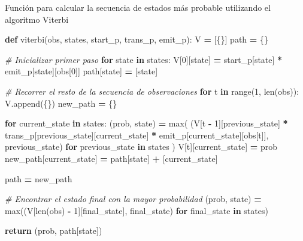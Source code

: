 \documentclass[
  a4paper,
  DIV=11,
  numbers=noendperiod]{scrreprt}
\newenvironment{Shaded}{\begin{snugshade}}{\end{snugshade}}
\newcommand{\BuiltInTok}[1]{#1}
\newcommand{\CommentTok}[1]{\textcolor[rgb]{0.56,0.35,0.01}{\textit{#1}}}
\newcommand{\ControlFlowTok}[1]{\textcolor[rgb]{0.13,0.29,0.53}{\textbf{#1}}}
\newcommand{\DecValTok}[1]{\textcolor[rgb]{0.00,0.00,0.81}{#1}}
\newcommand{\KeywordTok}[1]{\textcolor[rgb]{0.13,0.29,0.53}{\textbf{#1}}}
\newcommand{\NormalTok}[1]{#1}
\newcommand{\OperatorTok}[1]{\textcolor[rgb]{0.81,0.36,0.00}{\textbf{#1}}}
\begin{document}
Función para calcular la secuencia de estados más probable utilizando el
algoritmo Viterbi

\begin{Shaded}
\begin{Highlighting}[numbers=left,,]
\KeywordTok{def}\NormalTok{ viterbi(obs, states, start\_p, trans\_p, emit\_p):}
\NormalTok{    V }\OperatorTok{=}\NormalTok{ [\{\}]}
\NormalTok{    path }\OperatorTok{=}\NormalTok{ \{\}}

    \CommentTok{\# Inicializar primer paso}
    \ControlFlowTok{for}\NormalTok{ state }\KeywordTok{in}\NormalTok{ states:}
\NormalTok{        V[}\DecValTok{0}\NormalTok{][state] }\OperatorTok{=}\NormalTok{ start\_p[state] }\OperatorTok{*}\NormalTok{ emit\_p[state][obs[}\DecValTok{0}\NormalTok{]]}
\NormalTok{        path[state] }\OperatorTok{=}\NormalTok{ [state]}

    \CommentTok{\# Recorrer el resto de la secuencia de observaciones}
    \ControlFlowTok{for}\NormalTok{ t }\KeywordTok{in} \BuiltInTok{range}\NormalTok{(}\DecValTok{1}\NormalTok{, }\BuiltInTok{len}\NormalTok{(obs)):}
\NormalTok{        V.append(\{\})}
\NormalTok{        new\_path }\OperatorTok{=}\NormalTok{ \{\}}

        \ControlFlowTok{for}\NormalTok{ current\_state }\KeywordTok{in}\NormalTok{ states:}
\NormalTok{            (prob, state) }\OperatorTok{=} \BuiltInTok{max}\NormalTok{(}
\NormalTok{                (V[t }\OperatorTok{{-}} \DecValTok{1}\NormalTok{][previous\_state] }\OperatorTok{*}\NormalTok{ trans\_p[previous\_state][current\_state] }\OperatorTok{*}\NormalTok{ emit\_p[current\_state][obs[t]], previous\_state)}
                \ControlFlowTok{for}\NormalTok{ previous\_state }\KeywordTok{in}\NormalTok{ states}
\NormalTok{            )}
\NormalTok{            V[t][current\_state] }\OperatorTok{=}\NormalTok{ prob}
\NormalTok{            new\_path[current\_state] }\OperatorTok{=}\NormalTok{ path[state] }\OperatorTok{+}\NormalTok{ [current\_state]}

\NormalTok{        path }\OperatorTok{=}\NormalTok{ new\_path}

    \CommentTok{\# Encontrar el estado final con la mayor probabilidad}
\NormalTok{    (prob, state) }\OperatorTok{=} \BuiltInTok{max}\NormalTok{((V[}\BuiltInTok{len}\NormalTok{(obs) }\OperatorTok{{-}} \DecValTok{1}\NormalTok{][final\_state], final\_state) }\ControlFlowTok{for}\NormalTok{ final\_state }\KeywordTok{in}\NormalTok{ states)}

    \ControlFlowTok{return}\NormalTok{ (prob, path[state])}
\end{Highlighting}
\end{Shaded}
\end{document}
